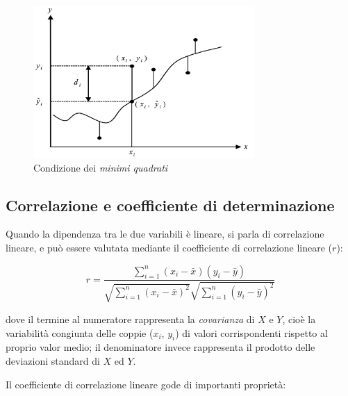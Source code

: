 \begin{figure}[H]
\centering
\includegraphics[width=0.75\textwidth,height=\textheight,keepaspectratio]{img/minimi_quadrati.png}
\caption{Condizione dei \textit{minimi quadrati} \cite{excel_per_statistica_belluco}}
\label{fig:minimi_quadrati}
\end{figure}

\subsection{Correlazione e coefficiente di determinazione}\label{ssec:regressione-correlazione}

Quando la dipendenza tra le due variabili è lineare, si parla di correlazione lineare, e può essere valutata mediante il coefficiente di correlazione lineare ($r$):

$$r=\frac{\sum_{i=1}^{n}\left(x_{i}-\bar{x}\right)\left(y_{i}-\bar{y}\right)}{\sqrt{\sum_{i=1}^{n}\left(x_{i}-\bar{x}\right)^{2}} \sqrt{\sum_{i=1}^{n}\left(y_{i}-\bar{y}\right)^{2}}}$$\smallskip

dove il termine al numeratore rappresenta la \textit{covarianza} di $X$ e $Y$, cioè la variabilità congiunta delle coppie ($x_i$, $y_i$) di valori corrispondenti rispetto al proprio valor medio; il denominatore invece rappresenta il prodotto delle deviazioni standard di $X$ ed $Y$.

Il coefficiente di correlazione lineare gode di importanti proprietà:

